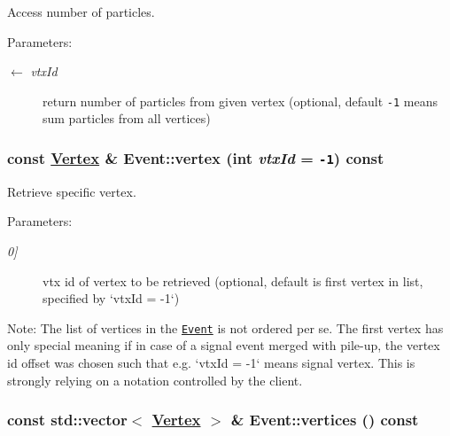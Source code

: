 Access number of particles. 

\begin{Desc}
\item[Parameters:]
\begin{description}
\item[\mbox{$\leftarrow$} {\em vtx\-Id}]return number of particles from given vertex (optional, default {\tt -1} means sum particles from all vertices) \end{description}
\end{Desc}
\hypertarget{classEvent_70086b70f2ace2dc6e04f48dd7f6eb0a}{
\subsubsection[vertex]{\setlength{\rightskip}{0pt plus 5cm}const \hyperlink{classVertex}{Vertex} \& Event::vertex (int {\em vtx\-Id} = {\tt -1}) const}}
\label{classEvent_70086b70f2ace2dc6e04f48dd7f6eb0a}


Retrieve specific vertex. 

\begin{Desc}
\item[Parameters:]
\begin{description}
\item[{\em 0\mbox{]}}]vtx id of vertex to be retrieved (optional, default is first vertex in list, specified by `vtx\-Id = -1`)\end{description}
\end{Desc}
\begin{Desc}
\item[Note:]The list of vertices in the {\tt \hyperlink{classEvent}{Event}} is not ordered per se. The first vertex has only special meaning if in case of a signal event merged with pile-up, the vertex id offset was chosen such that e.g. `vtx\-Id = -1` means signal vertex. This is strongly relying on a notation controlled by the client. \end{Desc}
\hypertarget{classEvent_ec6d4e1ebf6de2650abd8058674a621c}{
\subsubsection[vertices]{\setlength{\rightskip}{0pt plus 5cm}const std::vector$<$ \hyperlink{classVertex}{Vertex} $>$ \& Event::vertices () const}}
\label{classEvent_ec6d4e1ebf6de2650abd8058674a621c}


